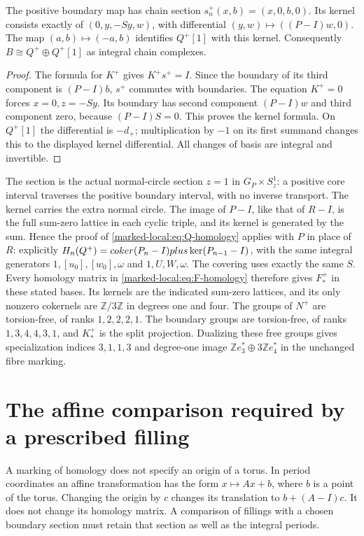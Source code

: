 \begin{proposition}\label{marked-local:prop:positive-splitting}
The positive boundary map has chain section
$s^+_n(x,b)=(x,0,b,0)$. Its kernel consists exactly of
$(0,y,-Sy,w)$, with differential $(y,w)\mapsto((P-I)w,0)$.
The map $(a,b)\mapsto(-a,b)$ identifies $Q^+[1]$ with this kernel.
Consequently $B\cong Q^+\oplus Q^+[1]$ as integral chain complexes.
\end{proposition}
\begin{proof}
The formula for $K^+$ gives $K^+s^+=I$. Since the boundary of
its third component is $(P-I)b$, $s^+$ commutes with boundaries.
The equation $K^+=0$ forces $x=0,z=-Sy$. Its boundary has
second component $(P-I)w$ and third component zero, because
$(P-I)S=0$. This proves the kernel formula. On $Q^+[1]$ the
differential is $-d_+$; multiplication by $-1$ on its first
summand changes this to the displayed kernel differential.
All changes of basis are integral and invertible.
\end{proof}

The section is the actual normal-circle section $z=1$ in
$G_P\times S^1_z$: a positive core interval traverses the positive
boundary interval, with no inverse transport. The kernel carries
the extra normal circle. The image of $P-I$, like that of $R-I$,
is the full sum-zero lattice in each cyclic triple, and its kernel
is generated by the sum. Hence the proof of
\eqref{marked-local:eq:Q-homology} applies with $P$ in place of $R$: explicitly
$H_n(Q^+)=coker(P_n-I)plus\ker(P_{n-1}-I)$, with the same
integral generators $1,[u_0],[w_0],\omega$ and $1,U,W,\omega$.
The covering uses exactly the same $S$. Every homology matrix in
\eqref{marked-local:eq:F-homology} therefore gives $F^+_*$ in these stated bases.
Its kernels are the indicated sum-zero lattices, and its only
nonzero cokernels are $\mathbb Z/3\mathbb Z$ in degrees one and four.
The groups of $N^+$ are torsion-free, of ranks $1,2,2,2,1$.
The boundary groups are torsion-free, of ranks $1,3,4,4,3,1$,
and $K^+_*$ is the split projection. Dualizing these free groups
gives specialization indices $3,1,1,3$ and degree-one image
$\mathbb Ze_3^*\oplus3\mathbb Ze_4^*$ in the unchanged fibre marking.

\section{The affine comparison required by a prescribed filling}

A marking of homology does not specify an origin of a torus.
In period coordinates an affine transformation has the form
$x\mapsto Ax+b$, where $b$ is a point of the torus. Changing the
origin by $c$ changes its translation to $b+(A-I)c$.
It does not change its homology matrix. A comparison of fillings
with a chosen boundary section must retain that section as well
as the integral periods.

